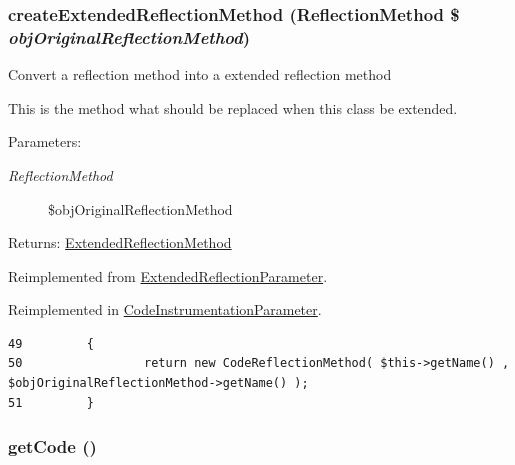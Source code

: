 \hypertarget{class_code_reflection_parameter_ec7c1d4b204b6e3a6291d3b867afb688}{
\subsubsection[{createExtendedReflectionMethod}]{\setlength{\rightskip}{0pt plus 5cm}createExtendedReflectionMethod (ReflectionMethod \$ {\em objOriginalReflectionMethod})}}
\label{class_code_reflection_parameter_ec7c1d4b204b6e3a6291d3b867afb688}


Convert a reflection method into a extended reflection method

This is the method what should be replaced when this class be extended.

\begin{Desc}
\item[Parameters:]
\begin{description}
\item[{\em ReflectionMethod}]\$objOriginalReflectionMethod \end{description}
\end{Desc}
\begin{Desc}
\item[Returns:]\hyperlink{class_extended_reflection_method}{ExtendedReflectionMethod} \end{Desc}


Reimplemented from \hyperlink{class_extended_reflection_parameter_ec7c1d4b204b6e3a6291d3b867afb688}{ExtendedReflectionParameter}.

Reimplemented in \hyperlink{class_code_instrumentation_parameter_ec7c1d4b204b6e3a6291d3b867afb688}{CodeInstrumentationParameter}.

\begin{Code}\begin{verbatim}49         {
50                 return new CodeReflectionMethod( $this->getName() , $objOriginalReflectionMethod->getName() );
51         }
\end{verbatim}
\end{Code}


\hypertarget{class_code_reflection_parameter_b5e24da53b4a0d0848b18c1e832f47ff}{
\subsubsection[{getCode}]{\setlength{\rightskip}{0pt plus 5cm}getCode ()}}
\label{class_code_reflection_parameter_b5e24da53b4a0d0848b18c1e832f47ff}


